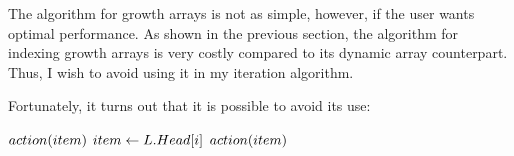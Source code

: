 \HdrGrowthArrayImpl

The algorithm for growth arrays is not as simple, however, if the user wants optimal performance. As shown in the previous section, the algorithm for indexing growth arrays is very costly compared to its dynamic array counterpart. Thus, I wish to avoid using it in my iteration algorithm.

Fortunately, it turns out that it is possible to avoid its use:

\begin{algorithm}[H]
	\begin{algorithmic}
			\For{$\LclItem \TextIn \LclBuffer$}
				\State $action(item)$
			\EndFor
		\EndFor
		\State $item \gets L.Head[i]$
		\State $action(item)$
		\EndFor
	\end{algorithmic}
\end{algorithm}